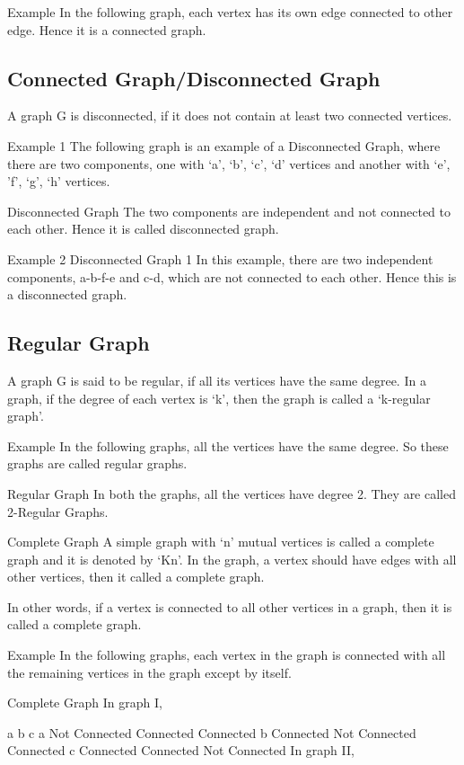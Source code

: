 Example
In the following graph, each vertex has its own edge connected to other edge. Hence it is a connected graph.

\subsection{Connected Graph/Disconnected Graph}
A graph G is disconnected, if it does not contain at least two connected vertices.

Example 1
The following graph is an example of a Disconnected Graph, where there are two components, one with ‘a’, ‘b’, ‘c’, ‘d’ vertices and another with ‘e’, ’f’, ‘g’, ‘h’ vertices.

Disconnected Graph
The two components are independent and not connected to each other. Hence it is called disconnected graph.

Example 2
Disconnected Graph 1
In this example, there are two independent components, a-b-f-e and c-d, which are not connected to each other. Hence this is a disconnected graph.

\subsection{Regular Graph}
A graph G is said to be regular, if all its vertices have the same degree. In a graph, if the degree of each vertex is ‘k’, then the graph is called a ‘k-regular graph’.

Example
In the following graphs, all the vertices have the same degree. So these graphs are called regular graphs.

Regular Graph
In both the graphs, all the vertices have degree 2. They are called 2-Regular Graphs.

Complete Graph
A simple graph with ‘n’ mutual vertices is called a complete graph and it is denoted by ‘Kn’. In the graph, a vertex should have edges with all other vertices, then it called a complete graph.

In other words, if a vertex is connected to all other vertices in a graph, then it is called a complete graph.

Example
In the following graphs, each vertex in the graph is connected with all the remaining vertices in the graph except by itself.

Complete Graph
In graph I,

a	b	c
a	Not Connected	Connected	Connected
b	Connected	Not Connected	Connected
c	Connected	Connected	Not Connected
In graph II,

